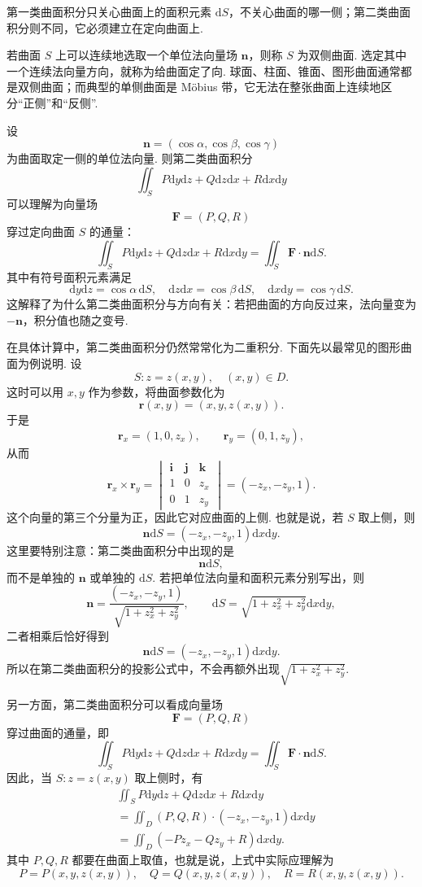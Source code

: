 \documentclass{ctexart}
\begin{document}
第一类曲面积分只关心曲面上的面积元素 $\mathrm{d}S$，不关心曲面的哪一侧；第二类曲面积分则不同，它必须建立在定向曲面上.

若曲面 $S$ 上可以连续地选取一个单位法向量场 $\boldsymbol{n}$，则称 $S$ 为双侧曲面. 选定其中一个连续法向量方向，就称为给曲面定了向. 球面、柱面、锥面、图形曲面通常都是双侧曲面；而典型的单侧曲面是 M\"obius 带，它无法在整张曲面上连续地区分“正侧”和“反侧”.

设
\[
\boldsymbol{n}=(\cos\alpha,\cos\beta,\cos\gamma)
\]
为曲面取定一侧的单位法向量. 则第二类曲面积分
\[
\iint_{S}P\mathrm{d}y\mathrm{d}z+Q\mathrm{d}z\mathrm{d}x+R\mathrm{d}x\mathrm{d}y
\]
可以理解为向量场
\[
\boldsymbol{F}=(P,Q,R)
\]
穿过定向曲面 $S$ 的通量：
\[
\iint_{S}P\mathrm{d}y\mathrm{d}z+Q\mathrm{d}z\mathrm{d}x+R\mathrm{d}x\mathrm{d}y
=
\iint_{S}\boldsymbol{F}\cdot \boldsymbol{n}\mathrm{d}S.
\]
其中有符号面积元素满足
\[
\mathrm{d}y\mathrm{d}z=\cos\alpha\,\mathrm{d}S,\quad
\mathrm{d}z\mathrm{d}x=\cos\beta\,\mathrm{d}S,\quad
\mathrm{d}x\mathrm{d}y=\cos\gamma\,\mathrm{d}S.
\]
这解释了为什么第二类曲面积分与方向有关：若把曲面的方向反过来，法向量变为 $-\boldsymbol{n}$，积分值也随之变号.

在具体计算中，第二类曲面积分仍然常常化为二重积分. 下面先以最常见的图形曲面为例说明. 设
\[
S:z=z(x,y),\quad (x,y)\in D.
\]
这时可以用 $x,y$ 作为参数，将曲面参数化为
\[
\boldsymbol{r}(x,y)=(x,y,z(x,y)).
\]
于是
\[
\boldsymbol{r}_{x}=(1,0,z_{x}),\qquad
\boldsymbol{r}_{y}=(0,1,z_{y}),
\]
从而
\[
\boldsymbol{r}_{x}\times \boldsymbol{r}_{y}
=
\begin{vmatrix}
\boldsymbol{i}&\boldsymbol{j}&\boldsymbol{k}\\
1&0&z_{x}\\
0&1&z_{y}
\end{vmatrix}
=(-z_{x},-z_{y},1).
\]
这个向量的第三个分量为正，因此它对应曲面的上侧. 也就是说，若 $S$ 取上侧，则
\[
\boldsymbol{n}\mathrm{d}S=(-z_{x},-z_{y},1)\mathrm{d}x\mathrm{d}y.
\]
这里要特别注意：第二类曲面积分中出现的是
\[
\boldsymbol{n}\mathrm{d}S,
\]
而不是单独的 $\boldsymbol{n}$ 或单独的 $\mathrm{d}S$. 若把单位法向量和面积元素分别写出，则
\[
\boldsymbol{n}
=\frac{(-z_{x},-z_{y},1)}{\sqrt{1+z_{x}^{2}+z_{y}^{2}}},
\qquad
\mathrm{d}S=\sqrt{1+z_{x}^{2}+z_{y}^{2}}\mathrm{d}x\mathrm{d}y,
\]
二者相乘后恰好得到
\[
\boldsymbol{n}\mathrm{d}S=(-z_{x},-z_{y},1)\mathrm{d}x\mathrm{d}y.
\]
所以在第二类曲面积分的投影公式中，不会再额外出现$\sqrt{1+z_{x}^{2}+z_{y}^{2}}.$

另一方面，第二类曲面积分可以看成向量场
\[
\boldsymbol{F}=(P,Q,R)
\]
穿过曲面的通量，即
\[
\iint_{S}P\mathrm{d}y\mathrm{d}z+Q\mathrm{d}z\mathrm{d}x+R\mathrm{d}x\mathrm{d}y
=
\iint_{S}\boldsymbol{F}\cdot \boldsymbol{n}\mathrm{d}S.
\]
因此，当 $S:z=z(x,y)$ 取上侧时，有
\[
\begin{aligned}
&\iint_{S}P\mathrm{d}y\mathrm{d}z+Q\mathrm{d}z\mathrm{d}x+R\mathrm{d}x\mathrm{d}y\\
&=\iint_{D}(P,Q,R)\cdot(-z_{x},-z_{y},1)\mathrm{d}x\mathrm{d}y\\
&=\iint_{D}\left(-Pz_{x}-Qz_{y}+R\right)\mathrm{d}x\mathrm{d}y.
\end{aligned}
\]
其中 $P,Q,R$ 都要在曲面上取值，也就是说，上式中实际应理解为
\[
P=P(x,y,z(x,y)),\quad Q=Q(x,y,z(x,y)),\quad R=R(x,y,z(x,y)).
\]
\end{document}
